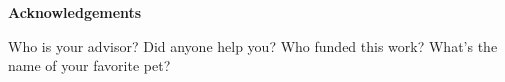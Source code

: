 
\newenvironment{acknowledgements}%
    {\cleardoublepage\thispagestyle{empty}\null\vfill\begin{center}%
    \bfseries Acknowledgements\end{center}}%
    {\vfill\null}
        \begin{acknowledgements}
            Who is your advisor? 
            Did anyone help you? 
            Who funded this work? 
            What's the name of your favorite pet?
        \end{acknowledgements}

